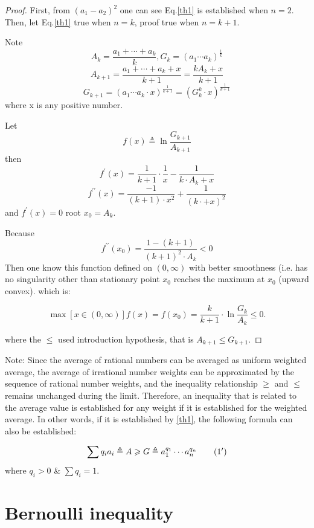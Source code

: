 \documentclass[12pt,a4paper,reqno]{amsart}
\theoremstyle{plain}
\theoremstyle{definition}
\begin{document}
\begin{proof} First, from $(a_1 - a_2)^2$ one can see Eq.\eqref{th1} is established when $n=2$. 
  Then, let Eq.\eqref{th1} true when $n=k$, proof true when $n=k+1$. 
  
  Note  
  $$A_k = \frac{a_1+\cdots+a_k}{k}, G_k = (a_1\cdots a_k)^{\frac{1}{k}}$$ 
  $$A_{k+1} = \frac{a_1+\cdots+a_k+x}{k+1} = \frac{kA_k+x}{k+1}$$ 
  $$ G_{k+1}=(a_1\cdots a_k\cdot x)^{\frac{1}{k+1}} = (G_k^k \cdot x)^{\frac{1}{k+1}}$$
  where x is any positive number. 

Let  $$f(x)\triangleq \ln \frac{G_{k+1}}{A_{k+1}} $$
then $$f^{\prime}(x)=\frac{1}{k+1}\cdot\frac{1}{x} - \frac{1}{k\cdot A_k+x}$$
$$ f^{\prime\prime}(x) = \frac{-1}{(k+1)\cdot x^2} + \frac{1}{(k\cdot+x)^2} $$
and  $f^{\prime}(x) = 0 $ root $x_0 = A_k$. 

Because $$ f^{\prime\prime}(x_0) = \frac{1-(k+1)}{(k+1)^2\cdot A_k} < 0 $$
Then one know this function defined on $(0, \infty)$ with better smoothness (i.e. has no singularity other than stationary point $x_0$ reaches the maximum at $x_0$ (upward convex). which is: 

$$
\max[x\in (0, \infty)] f(x) = f(x_0) = \frac{k}{k+1}\cdot \ln \frac{G_k}{A_k} \leqslant 0. 
$$

where the $\leqslant$ used introduction hypothesis, that is $A_{k+1} \leqslant G_{k+1}$. 
\end{proof}

Note: Since the average of rational numbers can be averaged as uniform weighted average, the average of irrational number weights can be approximated by the sequence of rational number weights, and the inequality relationship $\geqslant$ and $\leqslant$ remains unchanged during the limit. Therefore, an inequality that is related to the average value is established for any weight if it is established for the weighted average. In other words, if it is established by \eqref{th1}, the following formula can also be established:

\begin{equation}
\sum q_i a_i \triangleq A \geqslant G \triangleq a_1^{q_1} \cdots a_n^{q_n} \tag{$1^{\prime}$}
\end{equation}
where $q_i > 0$ \& $\sum q_i = 1$. 


\section{Bernoulli inequality}
\end{document}
